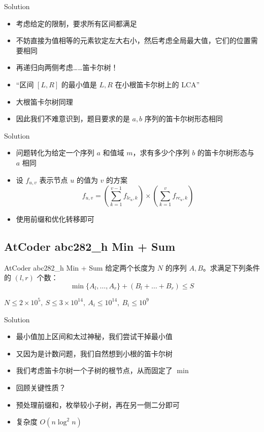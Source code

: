 ﻿\documentclass[aspectratio=169,handout]{ctexbeamer}
\begin{document}
\begin{frame}{Solution}
    \begin{itemize}
        \item 考虑给定的限制，要求所有区间都满足
        \item 不妨直接为值相等的元素钦定左大右小，然后考虑全局最大值，它们的位置需要相同
        \item 再递归向两侧考虑……笛卡尔树！
        \item “区间 $[L,R]$ 的最小值是 $L,R$ 在小根笛卡尔树上的 LCA”
        \item 大根笛卡尔树同理
        \item 因此我们不难意识到，题目要求的是 $a,b$ 序列的笛卡尔树\textcolor{peaking}{形态}相同
    \end{itemize}
\end{frame}

\begin{frame}{Solution}
    \begin{itemize}
        \item 问题转化为给定一个序列 $a$ 和值域 $m$，求有多少个序列 $b$ 的笛卡尔树形态与 $a$ 相同
        \item 设 $f_{u,v}$ 表示节点 $u$ 的值为 $v$ 的方案
        $$
            f_{u,v}=\left(\sum_{k=1}^{v-1}f_{lc_u,k}\right)\times\left(\sum_{k=1}^{v}f_{rc_u,k}\right)
        $$
        \item 使用前缀和优化转移即可
    \end{itemize}
\end{frame}





\subsection{AtCoder abc282\_h Min + Sum}
\begin{frame}{AtCoder abc282\_h Min + Sum}
    给定两个长度为 $N$ 的序列 $A,B$。求满足下列条件的 $(l,r)$ 个数：
    \[\min\{A_l,\dots,A_r\}+(B_l+\dots+B_r)\le S\]
    
    $N\le 2\times10^5,\ S\le 3\times10^{14},\ A_i\le 10^{14},\ B_i\le 10^9$
\end{frame}

\begin{frame}{Solution}
    \begin{itemize}
        \item 最小值加上区间和太过神秘，我们尝试干掉最小值
        \item 又因为是计数问题，我们自然想到小根的笛卡尔树
        \item 我们考虑笛卡尔树一个子树的根节点，从而固定了 $\min$
        \item 回顾关键性质？
        \item 预处理前缀和，枚举较小子树，再在另一侧二分即可
        \item 复杂度 $O(n\log^2n)$
    \end{itemize}
\end{frame}
\end{document}
